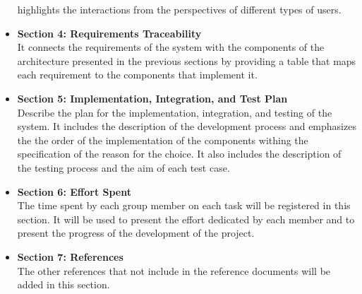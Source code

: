 \begin{itemize}
    highlights the interactions from the perspectives of different types of users.
    \item \textbf{Section 4: Requirements Traceability}
    \\It connects the requirements of the system with the components of the architecture presented in the previous sections by providing a table that maps each
    requirement to the components that implement it. 
    \item \textbf{Section 5: Implementation, Integration, and Test Plan}
    \\Describe the plan for the implementation, integration, and testing of the system. It includes the description of the development process and emphasizes the
    the order of the implementation of the components withing the specification of the reason for the choice. It also includes the description of the testing
    process and the aim of each test case.
    \item \textbf{Section 6: Effort Spent}
    \\The time spent by each group member on each task will be registered in this section. It will be used to present the effort dedicated 
    by each member and to present the progress of the development of the project.
    \item \textbf{Section 7: References}
    \\ The other references that not include in the reference documents will be added in this section.
\end{itemize}